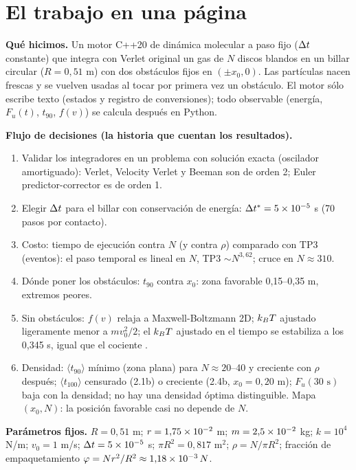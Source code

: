 \documentclass[10.5pt,a4paper]{article}
\begin{document}
\section{El trabajo en una página}

\textbf{Qué hicimos.} Un motor C++20 de dinámica molecular a paso fijo ($\Delta t$ constante) que integra con Verlet original un gas de $N$ discos blandos en un billar circular ($R=0{,}51$ m) con dos obstáculos fijos en $(\pm x_0,0)$. Las partículas nacen frescas y se vuelven usadas al tocar por primera vez un obstáculo. El motor sólo escribe texto (estados y registro de conversiones); todo observable (energía, $F_u(t)$, $t_{90}$, $f(v)$) se calcula después en Python.

\textbf{Flujo de decisiones (la historia que cuentan los resultados).}
\begin{enumerate}
\item Validar los integradores en un problema con solución exacta (oscilador amortiguado): Verlet, Velocity Verlet y Beeman son de orden 2; Euler predictor-corrector es de orden 1.
\item Elegir $\Delta t$ para el billar con conservación de energía: $\Delta t^{*}=5\times10^{-5}$ s (70 pasos por contacto).
\item Costo: tiempo de ejecución contra $N$ (y contra $\rho$) comparado con TP3 (eventos): el paso temporal es lineal en $N$, TP3 $\sim N^{3{,}62}$; cruce en $N\approx310$.
\item Dónde poner los obstáculos: $t_{90}$ contra $x_0$: zona favorable 0,15--0,35 m, extremos peores.
\item Sin obstáculos: $f(v)$ relaja a Maxwell-Boltzmann 2D; $k_BT$ ajustado ligeramente menor a $mv_0^2/2$; el $k_BT$ ajustado en el tiempo se estabiliza a los 0,345 s, igual que el cociente \vv.
\item Densidad: $\langle t_{90}\rangle$ mínimo (zona plana) para $N\approx20$--40 y creciente con $\rho$ después; $\langle t_{100}\rangle$ censurado (2.1b) o creciente (2.4b, $x_0=0{,}20$ m); $F_u(30\text{ s})$ baja con la densidad; no hay una densidad óptima distinguible. Mapa $(x_0,N)$: la posición favorable casi no depende de $N$.
\end{enumerate}

\textbf{Parámetros fijos.} $R=0{,}51$ m; $r=1{,}75\times10^{-2}$ m; $m=2{,}5\times10^{-2}$ kg; $k=10^4$ N/m; $v_0=1$ m/s; $\Delta t=5\times10^{-5}$ s; $\pi R^2=0{,}817$ m$^2$; $\rho=N/\pi R^2$; fracción de empaquetamiento $\varphi=Nr^2/R^2\approx1{,}18\times10^{-3}\,N$.
\end{document}
